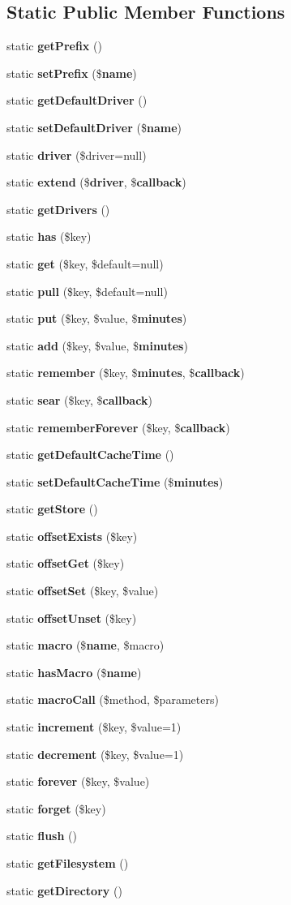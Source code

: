 \subsection*{Static Public Member Functions}
\begin{DoxyCompactItemize}
\item 
static {\bf get\+Prefix} ()
\item 
static {\bf set\+Prefix} (\${\bf name})
\item 
static {\bf get\+Default\+Driver} ()
\item 
static {\bf set\+Default\+Driver} (\${\bf name})
\item 
static {\bf driver} (\$driver=null)
\item 
static {\bf extend} (\${\bf driver}, \${\bf callback})
\item 
static {\bf get\+Drivers} ()
\item 
static {\bf has} (\$key)
\item 
static {\bf get} (\$key, \$default=null)
\item 
static {\bf pull} (\$key, \$default=null)
\item 
static {\bf put} (\$key, \$value, \${\bf minutes})
\item 
static {\bf add} (\$key, \$value, \${\bf minutes})
\item 
static {\bf remember} (\$key, \${\bf minutes}, \${\bf callback})
\item 
static {\bf sear} (\$key, \${\bf callback})
\item 
static {\bf remember\+Forever} (\$key, \${\bf callback})
\item 
static {\bf get\+Default\+Cache\+Time} ()
\item 
static {\bf set\+Default\+Cache\+Time} (\${\bf minutes})
\item 
static {\bf get\+Store} ()
\item 
static {\bf offset\+Exists} (\$key)
\item 
static {\bf offset\+Get} (\$key)
\item 
static {\bf offset\+Set} (\$key, \$value)
\item 
static {\bf offset\+Unset} (\$key)
\item 
static {\bf macro} (\${\bf name}, \$macro)
\item 
static {\bf has\+Macro} (\${\bf name})
\item 
static {\bf macro\+Call} (\$method, \$parameters)
\item 
static {\bf increment} (\$key, \$value=1)
\item 
static {\bf decrement} (\$key, \$value=1)
\item 
static {\bf forever} (\$key, \$value)
\item 
static {\bf forget} (\$key)
\item 
static {\bf flush} ()
\item 
static {\bf get\+Filesystem} ()
\item 
static {\bf get\+Directory} ()
\end{DoxyCompactItemize}
